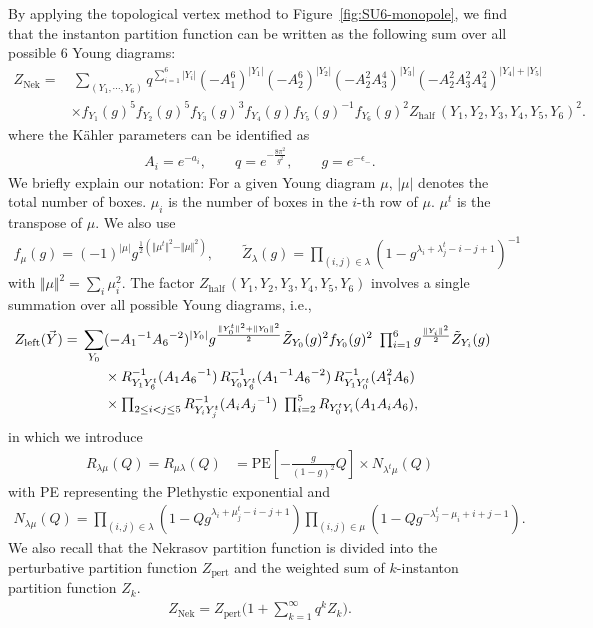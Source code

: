 \documentclass[letterpaper, 11pt]{article}
\newcommand{\nn}{\nonumber}
\begin{document}
{By applying the topological vertex method to Figure~\ref{fig:SU6-monopole}, we find that the instanton partition function can be  written as the following sum over all possible 6 Young diagrams:
\begin{align}
  \label{eq:znek-su6}
  Z_{\text{Nek}} 
  =&\, \sum_{(Y_1, \cdots, Y_6)}q^{\sum_{i=1}^6|Y_i|} (-A_1^6)^{|Y_1|}(-A_2^6)^{|Y_2|}(-A_2^2A_3^4)^{|Y_3|}(-A_2^2A_3^2A_4^2)^{|Y_4| + |Y_5|}\nn\\
  &\times f_{Y_1}(g)^5f_{Y_2}(g)^5f_{Y_3}(g)^3f_{Y_4}(g)f_{Y_5}(g)^{-1}f_{Y_6}(g)^{2}Z_{\text{half}}\,(Y_1, Y_2, Y_3, Y_4, Y_5, Y_6)^2. 
  \end{align}
  where the K\"ahler parameters can be identified as 
\begin{align}
A_i = e^{-a_i}, \qquad q = e^{-\frac{8\pi^2}{g^2}}, \qquad g=e^{-\epsilon_-}.
\end{align}
We briefly explain our notation: For a given Young diagram $\mu$, $|\mu|$ denotes the total number of boxes. $\mu_i$ is the number of boxes in the $i$-th row of $\mu$. $\mu^t$ is the transpose of $\mu$. We also use
\begin{align}
f_\mu(g) = (-1)^{|\mu|}g^{\frac{1}{2}({\Vert \mu^t\Vert ^2 - \Vert \mu\Vert ^2})}, \qquad \tilde{Z}_{\lambda}(g) 
= \prod_{(i,j) \in \lambda} {(1 - g^{\lambda_i + \lambda^t_j - i - j +1} )^{-1}}
\end{align}
with $\Vert \mu \Vert^2   = \sum_{i} \mu_i^2$. The factor $Z_{\text{half}}\,(Y_1, Y_2, Y_3, Y_4, Y_5, Y_6)$ involves a single summation over all possible Young diagrams, i.e.,
\begin{align}
Z_{\text{left}}(\vec{Y})= \,
\sum_{Y_0} &( - A_1{}^{-1} A_6{}^{-2})^{|Y_0|} 
g^{\frac{\Vert Y_0^t\Vert ^2+\Vert Y_0\Vert ^2}{2}} \tilde{Z}_{Y_0}(g)^2 f_{Y_0}(g)^2
\ \textstyle\prod_{i=1}^6 g^{\frac{\Vert Y_i\Vert ^2}{2}} \tilde{Z}_{Y_i} (g)
\cr 
& 
\times 
R_{Y_1 Y_6^t}^{-1} (A_1 A_6{}^{-1})\,R_{Y_0 Y_6^t}^{-1} (A_1{}^{-1} A_6{}^{-2})\,R_{Y_1Y_0^t }^{-1} (A_1^2A_6) \cr 
& 
\times  
 \textstyle\prod_{2 \le i <  j \le 5} R_{Y_i Y_j^t}^{-1} (A_i A_j{}^{-1})\ 
 \prod_{i=2}^5 R_{Y_0^t Y_i} (A_1 A_i  A_6) ,
\end{align}
in which we introduce
\begin{align}
R_{\lambda \mu} (Q)=R_{ \mu\lambda} (Q)
&= \text{PE} \left[ - \frac{g}{(1-g)^2} Q \right]
\times N_{\lambda^t \mu} (Q)
\end{align}
with PE representing the Plethystic exponential
 and 
\begin{align}
N_{\lambda \mu} (Q) 
= \prod_{(i,j) \in \lambda} \left( 1 - Q g^{\lambda_i + \mu_j^t -i-j+1} \right)
\prod_{(i,j) \in \mu} \left( 1 - Q g^{-\lambda^t_j - \mu_i + i + j - 1} \right).
\end{align}
We also recall that the Nekrasov partition function is divided into the perturbative partition function $Z_{\text{pert}}$ and the weighted sum of $k$-instanton partition function $Z_k$.
\begin{align}
Z_{\text{Nek}} = Z_{\text{pert}}\Big(1 + \sum_{k=1}^{\infty}q^kZ_k\Big).
\end{align}

}
\end{document}
